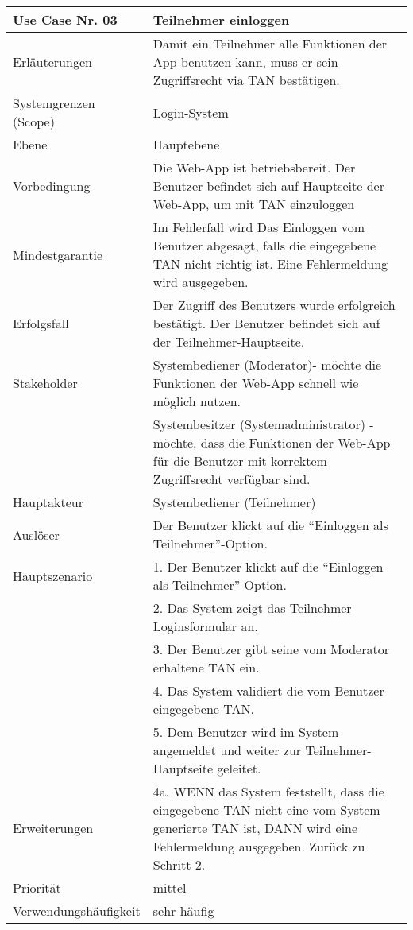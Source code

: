 \begin{tabularx}{\linewidth}{|l|X|}
	\hline
	Use Case Nr. 03			& \textbf{Teilnehmer einloggen} \\ \hline
	Erläuterungen			& Damit ein Teilnehmer alle Funktionen der App benutzen kann, 
							  muss er sein Zugriffsrecht via TAN bestätigen. \\ \hline
	Systemgrenzen (Scope)	& Login-System \\ \hline
	Ebene					& Hauptebene \\ \hline
	Vorbedingung			& Die Web-App ist betriebsbereit. Der Benutzer befindet sich auf
							  Hauptseite der Web-App, um mit TAN einzuloggen \\ \hline
	Mindestgarantie			& Im Fehlerfall wird Das Einloggen vom Benutzer abgesagt, falls die 
							  eingegebene TAN nicht richtig ist. Eine Fehlermeldung wird 
							  ausgegeben. \\ \hline
	Erfolgsfall 			& Der Zugriff des Benutzers wurde erfolgreich bestätigt. Der
							  Benutzer befindet sich auf der Teilnehmer-Hauptseite. \\ \hline
	Stakeholder				& Systembediener (Moderator)- möchte die Funktionen der Web-App 
							  schnell wie möglich nutzen. \\
							& Systembesitzer (Systemadministrator) - möchte, dass die Funktionen   
							  der Web-App für die Benutzer mit korrektem Zugriffsrecht verfügbar sind.\\ \hline
	Hauptakteur				& Systembediener (Teilnehmer) \\ \hline
	Auslöser				& Der Benutzer klickt auf die ``Einloggen als Teilnehmer''-Option.
							  \\ \hline
	Hauptszenario			& 1. Der Benutzer klickt auf die ``Einloggen als Teilnehmer''-Option.
							  \\
	                        & 2. Das System zeigt das Teilnehmer-Loginsformular an. \\
							& 3. Der Benutzer gibt seine vom Moderator erhaltene TAN ein. \\
							& 4. Das System validiert die vom Benutzer eingegebene
							  TAN. \\
							& 5. Dem Benutzer wird im System angemeldet und weiter zur
							  Teilnehmer-Hauptseite geleitet. \\ \hline
	Erweiterungen			& 4a. WENN das System feststellt, dass die eingegebene TAN nicht 
							  eine vom System generierte TAN ist, DANN wird eine Fehlermeldung 
							  ausgegeben. Zurück zu Schritt 2. \\ \hline
	Priorität				& mittel \\ \hline
	Verwendungshäufigkeit	& sehr häufig \\ \hline
\end{tabularx}
